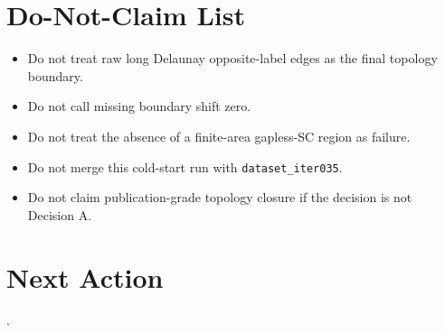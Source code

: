 \documentclass[11pt]{article}
\begin{document}
\section{Do-Not-Claim List}
\begin{itemize}
\item Do not treat raw long Delaunay opposite-label edges as the final topology boundary.
\item Do not call missing boundary shift zero.
\item Do not treat the absence of a finite-area gapless-SC region as failure.
\item Do not merge this cold-start run with \texttt{dataset\_iter035}.
\item Do not claim publication-grade topology closure if the decision is not Decision A.
\end{itemize}

\section{Next Action}
\texttt{}.
\end{document}
